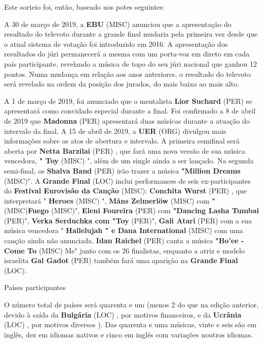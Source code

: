 \documentclass[12pt,a4paper]{article}
\begin{document}
Este sorteio foi, então, baseado nos potes seguintes:

A 30 de março de 2019, a \textbf{EBU} (MISC) anunciou que a apresentação do resultado do televoto durante a grande final mudaria pela primeira vez desde que o atual sistema de votação foi introduzido em 2016. A apresentação dos resultados do júri permanecerá a mesma com um porta-voz em direto em cada país participante, revelando a música de topo do seu júri nacional que ganhou 12 pontos. Numa mudança em relação aos anos anteriores, o resultado do televoto será revelado na ordem da posição dos jurados, do mais baixo ao mais alto.

A 1 de março de 2019, foi anunciado que o mentalista \textbf{Lior Suchard} (PER) se apresentará como convidado especial durante a final. Foi confirmado a 8 de abril de 2019 que \textbf{Madonna} (PER) apresentará duas músicas durante a atuação do intervalo da final. A 15 de abril de 2019, a \textbf{UER} (ORG) divulgou mais informações sobre os atos de abertura e intervalo. A primeira semifinal será aberta por \textbf{Netta Barzilai} (PER) , que fará uma nova versão de sua música vencedora, \textbf{" Toy} (MISC) ", além de um single ainda a ser lançado. Na segunda semi-final, os \textbf{Shalva Band} (PER) irão trazer a música \textbf{"Million Dreams} (MISC)". A \textbf{Grande Final} (LOC) inclui performances de seis ex-participantes do \textbf{Festival Eurovisão da Canção} (MISC): \textbf{Conchita Wurst} (PER) , que interpretará " \textbf{Heroes} (MISC) ", \textbf{Måns Zelmerlöw} (MISC) com \textbf{"} (MISC)\textbf{Fuego} (MISC)", \textbf{Eleni Foureira} (PER) com \textbf{"Dancing Lasha Tumbai} (PER)", \textbf{Verka Serduchka com "Toy} (PER)", \textbf{Gali Atari} (PER) com a sua música vencedora " \textbf{Hallelujah " e Dana International} (MISC) com uma canção ainda não anunciada. \textbf{Idan Raichel} (PER) canta a música \textbf{"Bo'ee - Come To} (MISC) Me" junto com os 26 finalistas, enquanto a atriz e modelo israelita \textbf{Gal Gadot} (PER) também fará uma aparição na \textbf{Grande Final} (LOC).



Países participantes

O número total de países será quarenta e um (menos 2 do que na edição anterior, devido à saída da \textbf{Bulgária} (LOC) , por motivos financeiros, e da \textbf{Ucrânia} (LOC) , por motivos diversos ). Das quarenta e uma músicas, vinte e seis são em inglês, dez em idiomas nativos e cinco em inglês com variações noutros idiomas.
\end{document}
